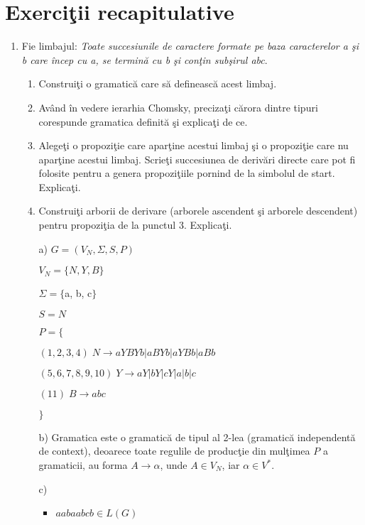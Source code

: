 \section{Exerciţii recapitulative}

\begin{enumerate}
\item
Fie limbajul: \textit{Toate succesiunile de caractere formate pe baza caracterelor a şi b care încep cu a, se termină cu b şi conţin subşirul abc}.
\begin{enumerate}
\item 
Construiţi o gramatică care să definească acest limbaj.	
\item 
Având în vedere ierarhia Chomsky, precizaţi cărora dintre tipuri corespunde gramatica definită şi explicaţi de ce.
\item 
Alegeţi o propoziţie care aparţine acestui limbaj şi o propoziţie care nu aparţine acestui limbaj. Scrieţi succesiunea de derivări directe care pot fi folosite pentru a genera propoziţiile pornind de la simbolul de start. Explicaţi.
\item 
Construiţi arborii de derivare (arborele ascendent şi arborele descendent) pentru propoziţia de la punctul 3. Explicaţi.
\end{enumerate}

\begin{itemize}
\item[a)]
$G = (V_{N}, \Sigma, S, P)$

$V_{N}= \{N, Y, B\}$

$\Sigma = \{$a, b, c$\} $ 

$S = N$

$P=\{$

$(1,2,3,4) \; N \rightarrow a Y B Y b | a B Y b | a Y B b | a B b$

$(5,6,7,8,9,10) \; Y \rightarrow a Y | b Y | c Y | a | b | c$

$(11) \; B \rightarrow abc $

$\}$

\item[b)] 
Gramatica este o gramatică de tipul al 2-lea (gramatică independentă de context), deoarece toate regulile de producţie din mulţimea $P$ a gramaticii, au forma $A \rightarrow \alpha$, unde $A \in V_N$, iar $\alpha \in V^*$.

\item[c)] 
\begin{itemize}
\item $aabaabcb \in L(G)$


\end{itemize}
\end{itemize}
\end{enumerate}
